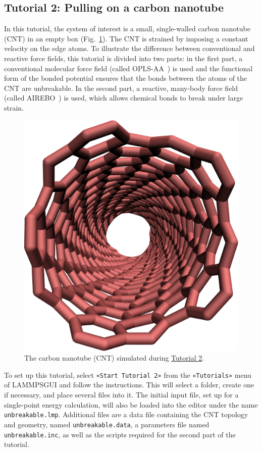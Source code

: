 \documentclass[9pt,tutorial]{livecoms}
\newcommand{\flecmd}[1]{\textcolor{command}{\texttt{#1}}} %
\newcommand{\guicmd}[1]{\textcolor{command}{\texttt{«#1»}}} %
\newcommand{\lammpsgui}{\textsf{LAMMPS\textendash GUI}}
\begin{document}
\subsection{Tutorial 2: Pulling on a carbon nanotube}
\label{carbon-nanotube-label}

In this tutorial, the system of interest is a small, single-walled
carbon nanotube (CNT) in an empty box (Fig.~\ref{fig:CNT}).  The CNT is
strained by imposing a constant velocity on the edge atoms.  To
illustrate the difference between conventional and reactive force
fields, this tutorial is divided into two parts: in the first part, a
conventional molecular force field (called
OPLS-AA~\cite{jorgensenDevelopmentTestingOPLS1996}) is used and the
functional form of the bonded potential ensures that the
bonds between the atoms of the CNT are unbreakable.  In the second part,
a reactive, many-body force field (called
AIREBO~\cite{stuart2000reactive}) is used, which allows chemical bonds
to break under large strain.
\begin{figure}
\centering
\includegraphics[width=0.55\linewidth]{CNT}
\caption{The carbon nanotube (CNT) simulated during
\hyperref[carbon-nanotube-label]{Tutorial 2}.}
\label{fig:CNT}
\end{figure}

To set up this tutorial, select \guicmd{Start Tutorial 2} from the
\guicmd{Tutorials} menu of \lammpsgui{} and follow the instructions.
This will select a folder, create one if necessary, and place several
files into it.  The initial input file, set up for a single-point energy
calculation, will also be loaded into the editor under the name
\flecmd{unbreakable.lmp}.  Additional files are a data file containing
the CNT topology and geometry, named \flecmd{unbreakable.data}, a
parameters file named \flecmd{unbreakable.inc}, as well as the scripts
required for the second part of the tutorial.
\end{document}
